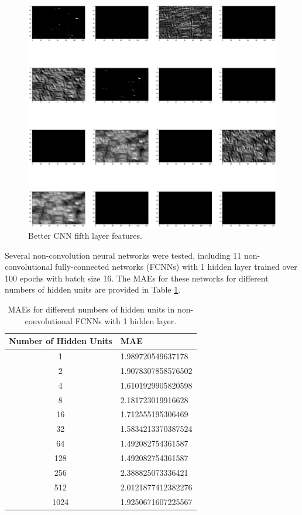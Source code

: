 \documentclass[12pt, oneside]{article}   	%
\begin{document}
\begin{figure}%
\includegraphics[width=\textwidth]{better_cnn_fifth_layer}
\caption{\label{fig:better_cnn_fifth_layer}Better CNN fifth layer features.}
\end{figure}

Several non-convolution neural networks were tested, including 11 non-convolutional fully-connected networks (FCNNs) with 1 hidden layer trained over 100 epochs with batch size 16. The MAEs for these networks for different numbers of hidden units are provided in Table \ref{table:fcnn_maes}.

\begin{table}
\begin{center}\begin{tabular}{c|l}
\textbf{Number of Hidden Units} & \textbf{MAE} \\ \hline
1 & 1.989720549637178 \\
2 & 1.9078307858576502 \\
4 & 1.6101929905820598 \\
8 & 2.181723019916628 \\
16 & 1.712555195306469 \\
32 & 1.5834213370387524 \\
64 & 1.492082754361587 \\
128 & 1.492082754361587 \\
256 & 2.388825073336421 \\
512 & 2.0121877412382276 \\
1024 & 1.9250671607225567 \\
\end{tabular}\end{center}
\caption{\label{table:fcnn_maes}MAEs for different numbers of hidden units in non-convolutional FCNNs with 1 hidden layer.}
\end{table} 
\end{document}

